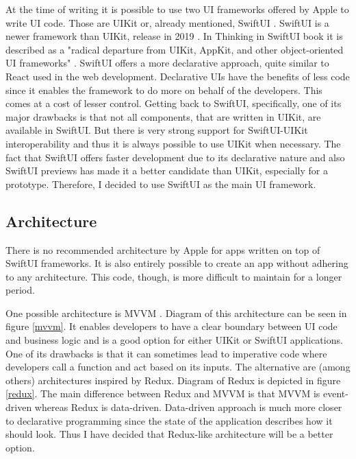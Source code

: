 At the time of writing it is possible to use two UI frameworks offered by Apple to write UI code. Those are UIKit \cite{uikit} or, already mentioned, SwiftUI \cite{swiftui}. SwiftUI is a newer framework than UIKit, release in 2019 \cite{swiftui-release}. In Thinking in SwiftUI book it is described as a "radical departure from UIKit, AppKit, and other object-oriented UI frameworks" \cite{thinking-in-swiftui}. SwiftUI offers a more declarative approach, quite similar to React \cite{react} used in the web development. Declarative UIs have the benefits of less code since it enables the framework to do more on behalf of the developers. This comes at a cost of lesser control. Getting back to SwiftUI, specifically, one of its major drawbacks is that not all components, that are written in UIKit, are available in SwiftUI. But there is very strong support for SwiftUI-UIKit interoperability \cite{swiftui-interop} and thus it is always possible to use UIKit when necessary. The fact that SwiftUI offers faster development due to its declarative nature and also SwiftUI previews \cite{swiftui-preview} has made it a better candidate than UIKit, especially for a prototype. Therefore, I decided to use SwiftUI as the main UI framework.

\subsection{Architecture}

There is no recommended architecture by Apple for apps written on top of SwiftUI frameworks. It is also entirely possible to create an app without adhering to any architecture. This code, though, is more difficult to maintain for a longer period.

One possible architecture is MVVM \cite{mvvm}. Diagram of this architecture can be seen in figure \ref{mvvm}. It enables developers to have a clear boundary between UI code and business logic and is a good option for either UIKit or SwiftUI applications. One of its drawbacks is that it can sometimes lead to imperative code where developers call a function and act based on its inputs. The alternative are (among others) architectures inspired by Redux. Diagram of Redux is depicted in figure \ref{redux}. The main difference between Redux and MVVM is that MVVM is event-driven whereas Redux is data-driven. Data-driven approach is much more closer to declarative programming since the state of the application describes how it should look. Thus I have decided that Redux-like architecture will be a better option.

